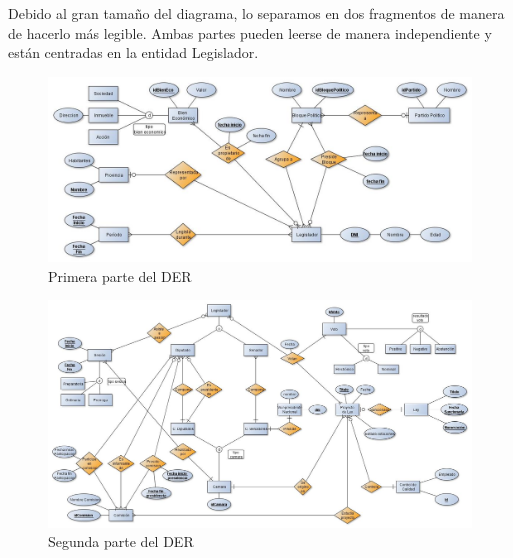 Debido al gran tama\~no del diagrama, lo separamos en dos fragmentos de manera de hacerlo m\'as legible. Ambas partes pueden leerse de manera independiente y est\'an centradas en la entidad Legislador.
			
		\begin{figure}[H]
		  \begin{center}
		    \includegraphics[scale=.41,angle=-90]{./imagenes/DER2-arriba.jpg}
		    \caption{Primera parte del DER} 
		    \label{fig:derparte1}
		  \end{center}
		\end{figure}
				
		\begin{figure}[H]
		  \begin{center}
		    \includegraphics[scale=.40,angle=-90]{./imagenes/DER2-abajo.jpg}
		    \caption{Segunda parte del DER} 
		    \label{fig:derparte2}
		  \end{center}
		\end{figure}